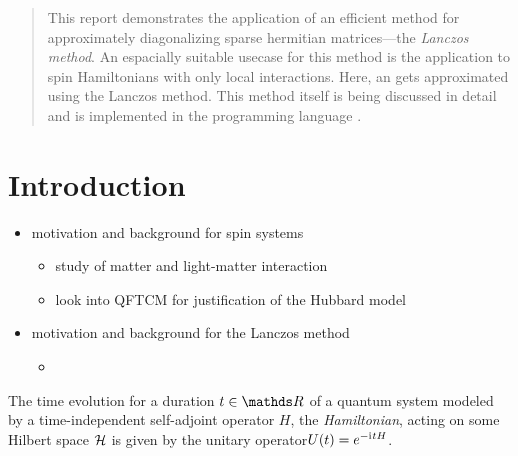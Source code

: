 
\begin{abstract}
    This report demonstrates the application of an efficient method for approximately diagonalizing sparse hermitian matrices---the \emph{Lanczos method}.
    An espacially suitable usecase for this method is the application to spin Hamiltonians with only local interactions. 
    Here, an  gets approximated using the Lanczos method.
    This method itself is being discussed in detail and is implemented in the programming language .
\end{abstract}

\section{Introduction}

\begin{itemize}
    \item motivation and background for spin systems
    \begin{itemize}
        \item study of matter and light-matter interaction
        \item look into QFTCM for justification of the Hubbard model
    \end{itemize}
    \item motivation and background for the Lanczos method
    \begin{itemize}
        \item 
    \end{itemize}
\end{itemize}


The time evolution for a duration \(t\in\R\) of a quantum system modeled by a time-independent self-adjoint operator \(H\), the \emph{Hamiltonian}, acting on some Hilbert space \(\mathcal{H}\) is given by the unitary operator\footnotemark \(U(t) = e^{-\mathrm{i}\mkern1mu t H}\).


